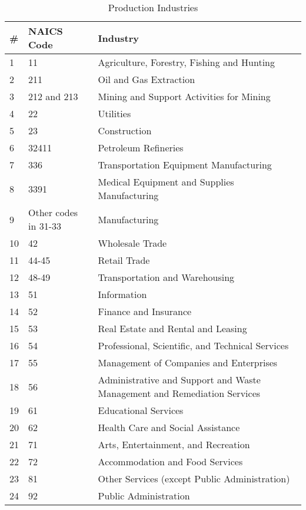\documentclass[article,11pt,letterpaper,fleqn]{article}
\theoremstyle{definition}
\numberwithin{equation}{section}
\begin{document}
\begin{table}[htbp]
  \centering
  \caption{Production Industries}
    \begin{tabular}{lll}
    \hline
    \hline
    \# & NAICS Code & Industry \\
    \hline
    1     & 11    & Agriculture, Forestry, Fishing and Hunting \\
    2     & 211   & Oil and Gas Extraction \\
    3     & 212 and 213 & Mining and Support Activities for Mining \\
    4     & 22    & Utilities \\
    5     & 23    & Construction \\
    6     & 32411 & Petroleum Refineries \\
    7     & 336   & Transportation Equipment Manufacturing \\
    8     & 3391  & Medical Equipment and Supplies Manufacturing \\
    9     & Other codes in 31-33 & Manufacturing \\
    10    & 42    & Wholesale Trade \\
    11    & 44-45 & Retail Trade \\
    12    & 48-49 & Transportation and Warehousing \\
    13    & 51    & Information \\
    14    & 52    & Finance and Insurance \\
    15    & 53    & Real Estate and Rental and Leasing \\
    16    & 54    & Professional, Scientific, and Technical Services \\
    17    & 55    & Management of Companies and Enterprises \\
    18    & 56    & Administrative and Support and Waste Management and Remediation Services \\
    19    & 61    & Educational Services \\
    20    & 62    & Health Care and Social Assistance \\
    21    & 71    & Arts, Entertainment, and Recreation \\
    22    & 72    & Accommodation and Food Services \\
    23    & 81    & Other Services (except Public Administration) \\
    24    & 92    & Public Administration \\
      \hline
    \hline
    \end{tabular}%
  \label{tab:prod_ind}%
\end{table}%
\end{document}
